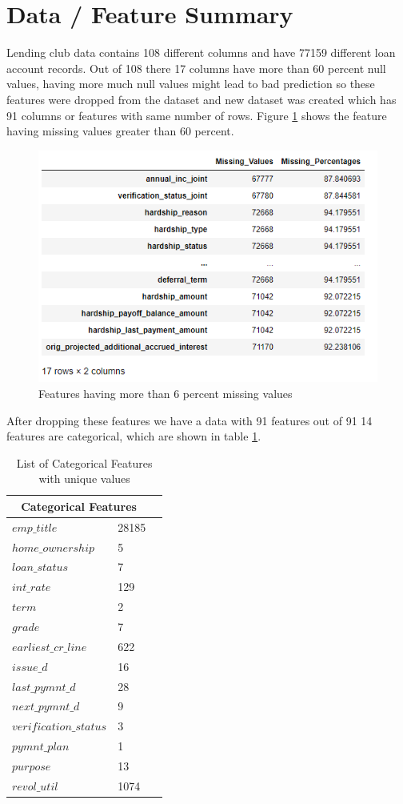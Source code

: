 \documentclass[12pt]{article}
\begin{document}
\section{Data / Feature Summary} 
Lending club data contains 108 different columns and have 77159 different loan account records. Out of 108 there 17 columns have more than 60 percent null values, having more much null values might lead to bad prediction so these features were dropped from the dataset and new dataset was created which has 91 columns or features with same number of rows. Figure \ref{fig:MissingValues} shows the feature having missing values greater than 60 percent.
\begin{figure}[h!]
	\centering
	\includegraphics{MissingValues.png}
	\caption{Features having more than 6 percent missing values}
	\label{fig:MissingValues}
\end{figure}
After dropping these features we have a data with 91 features out of 91 14 features are categorical, which are shown in table \ref{table:1}.
\begin{table}[h!]
	\centering
	\begin{tabular}{ |p{3cm}|p{3cm}|p{3cm}|  }
		\hline
		\multicolumn{2}{|c|}{Categorical Features} \\

		\hline
		$emp\_title$ & 28185 \\
		$home\_ownership$ & 5 \\
		$loan\_status$ & 7 \\
		$int\_rate$ & 129 \\
		$term$ & 2 \\
		$grade$ & 7 \\
		$earliest\_cr\_line$ & 622 \\
		$issue\_d$ & 16 \\
		$last\_pymnt\_d	$ & 28 \\
		$next\_pymnt\_d	$ & 9 \\
		$verification\_status$ & 3 \\
		$pymnt\_plan$ & 1 \\
		$purpose$ & 13 \\
		$revol\_util$ & 1074 \\
		\hline
	\end{tabular}
	\caption{List of Categorical Features with unique values}
	\label{table:1}
\end{table}
\end{document}
